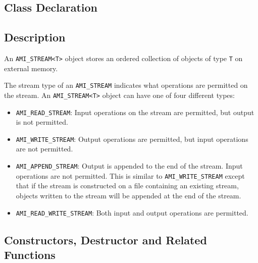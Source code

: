 \subsection{Class Declaration}
  \btabb
     {}
  \etabb

\subsection{Description}
An \lstinline|AMI_STREAM<T>| object stores an ordered collection of objects of
type \lstinline|T| on external memory.

The stream type of an \lstinline|AMI_STREAM| indicates what
operations are permitted on the stream.
An \lstinline|AMI_STREAM<T>| object can have one of four different
types:
\begin{itemize}
    
    \item \lstinline|AMI_READ_STREAM|: Input operations on
    the stream are permitted, but output is not permitted.
    
    \item \lstinline|AMI_WRITE_STREAM|: Output operations are
    permitted, but input operations are not permitted. 
    
    \item \lstinline|AMI_APPEND_STREAM|: Output is appended
    to the end of the stream. Input operations are not
    permitted. This is similar to
    \lstinline|AMI_WRITE_STREAM| except that if the stream is
    constructed on a file containing an existing stream,
    objects written to the stream will be appended at the
    end of the stream.

    \item \lstinline|AMI_READ_WRITE_STREAM|: Both input and output
    operations are permitted.
\end{itemize}

\clearpage

\subsection{Constructors, Destructor and Related Functions}


  \btabb
  
